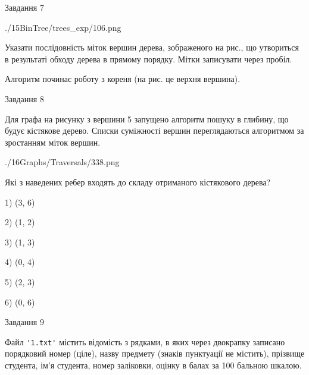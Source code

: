 \documentclass[12pt, ukrainian]{article}
\def\code#1{\Verb!#1!}
\begin{document}
{\vspace{10mm}\par

\newpage
\begin{minipage}[t]{9.7cm}
               
{\begin{center}Завдання {7}\end{center}}
\vspace{-6mm}

\begin{center}
	{./15BinTree/trees_exp/106.png}
\end{center}
Указати послідовність міток вершин дерева, зображеного на рис., що утвориться в результаті обходу дерева в прямому порядку. Мітки записувати через пробіл.\par Алгоритм починає роботу з кореня (на рис. це верхня вершина).\par

\end{minipage}
\vline \hspace{8mm}
\begin{minipage}[t]{8.0cm}
               
{\begin{center}Завдання {8}\end{center}}
\vspace{-6mm}
Для графа на рисунку з вершини 5 запущено алгоритм пошуку в глибину, що будує кістякове дерево. Списки суміжності вершин переглядаються алгоритмом за зростанням міток вершин.\par
\begin{center}
	{./16Graphs/Traversals/338.png}
\end{center}
\par Які з наведених ребер входять до складу отриманого кістякового дерева?\par
1) (3, 6)\par
2) (1, 2)\par
3) (1, 3)\par
4) (0, 4)\par
5) (2, 3)\par
6) (0, 6)\par
{\vskip 15pt} \par

\end{minipage}

               
{\begin{center}Завдання {9}\end{center}}
\vspace{-6mm}
Файл \code{'1.txt'} містить відомість з рядками, в яких через двокрапку записа\-но поряд\-ковий номер (ціле), назву предмету (знаків пунктуації не містить), прізвище студента, ім'я студента, номер заліковки, оцінку в балах за 100 бальною шкалою.

}
\end{document}
